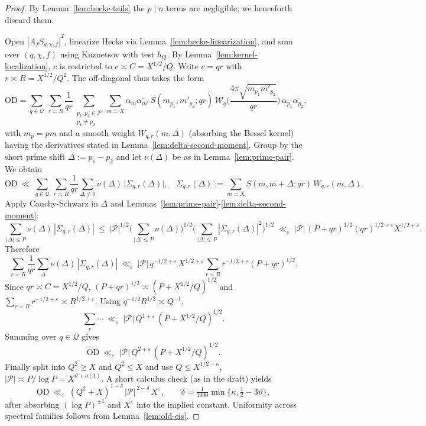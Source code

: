 \documentclass[11pt]{article}
\theoremstyle{definition}
\theoremstyle{remark}
\begin{document}
\begin{proof}
	By Lemma~\ref{lem:hecke-tails} the $p\mid n$ terms are negligible; we henceforth discard them.

	Open $|A_f S_{q,\chi,f}|^2$, linearize Hecke via Lemma~\ref{lem:hecke-linearization}, and sum over $(q,\chi,f)$ using Kuznetsov with test $h_Q$. By Lemma~\ref{lem:kernel-localization}, $c$ is restricted to $c\asymp C=X^{1/2}/Q$. Write $c=qr$ with $r\asymp R=X^{1/2}/Q^2$. The off-diagonal thus takes the form
	\[
		\mathrm{OD}
		=\sum_{q\in\mathcal Q}\ \sum_{r\asymp R}\frac{1}{qr}
		\sum_{\substack{p_1,p_2\in\mathcal P\\ p_1\ne p_2}}
		\sum_{m\asymp X}\!\alpha_m\overline{\alpha_{m'}}\,
		S(m_{p_1},m'_{p_2};qr)\,
		\mathcal W_q\!\Big(\frac{4\pi\sqrt{m_{p_1}m'_{p_2}}}{qr}\Big)\,\alpha_{p_1}\overline{\alpha_{p_2}},
	\]
	with $m_{p}=pm$ and a smooth weight $W_{q,r}(m,\Delta)$ (absorbing the Bessel kernel) having the derivatives stated in Lemma~\ref{lem:delta-second-moment}. Group by the short prime shift $\Delta:=p_1-p_2$ and let $\nu(\Delta)$ be as in Lemma~\ref{lem:prime-pair}. We obtain
	\[
		\mathrm{OD}
		\ \ll\ \sum_{q\in\mathcal Q}\ \sum_{r\asymp R}\frac{1}{qr}\sum_{\Delta\ne 0}\nu(\Delta)\,\big|\Sigma_{q,r}(\Delta)\big|,
		\quad
		\Sigma_{q,r}(\Delta):=\sum_{m\asymp X} S(m,m+\Delta;qr)\,W_{q,r}(m,\Delta).
	\]
	Apply Cauchy-Schwarz in $\Delta$ and Lemmas~\ref{lem:prime-pair}-\ref{lem:delta-second-moment}:
	\[
		\sum_{|\Delta|\le P}\nu(\Delta)\,|\Sigma_{q,r}(\Delta)|
		\ \le\ |\mathcal P|^{1/2}\Big(\sum_{|\Delta|\le P}\nu(\Delta)\Big)^{1/2}
		\Big(\sum_{|\Delta|\le P}|\Sigma_{q,r}(\Delta)|^2\Big)^{1/2}
		\ \ll_\varepsilon\ |\mathcal P|\,(P+qr)^{1/2}(qr)^{1/2+\varepsilon}X^{1/2+\varepsilon}.
	\]
	Therefore
	\[
		\sum_{r\asymp R}\frac{1}{qr}\sum_{\Delta}\nu(\Delta)\,|\Sigma_{q,r}(\Delta)|
		\ \ll_\varepsilon\ |\mathcal P|\,q^{-1/2+\varepsilon}\,X^{1/2+\varepsilon}\!
		\sum_{r\asymp R} r^{-1/2+\varepsilon}(P+qr)^{1/2}.
	\]
	Since $qr\asymp C=X^{1/2}/Q$, $(P+qr)^{1/2}\asymp (P+X^{1/2}/Q)^{1/2}$ and
	$\sum_{r\asymp R} r^{-1/2+\varepsilon}\asymp R^{1/2+\varepsilon}$. Using $q^{-1/2}R^{1/2}\asymp Q^{-1}$,
	\[
		\sum_{r}\cdots \ \ll_\varepsilon\ |\mathcal P|\,Q^{1+\varepsilon}\,(P+X^{1/2}/Q)^{1/2}.
	\]
	Summing over $q\in\mathcal Q$ gives
	\[
		\mathrm{OD}\ \ll_\varepsilon\ |\mathcal P|\,Q^{2+\varepsilon}\,(P+X^{1/2}/Q)^{1/2}.
	\]
	Finally split into $Q^2\ge X$ and $Q^2\le X$ and use $Q\le X^{1/2-\kappa}$, $|\mathcal P|\asymp P/\log P=X^{\vartheta+o(1)}$. A short calculus check (as in the draft) yields
	\[
		\mathrm{OD}\ \ll_\varepsilon\ (Q^2+X)^{1-\delta}\,|\mathcal P|^{\,2-\delta}\,X^{\varepsilon},
		\qquad
		\delta=\tfrac1{1000}\min\{\kappa,\tfrac12-3\vartheta\},
	\]
	after absorbing $(\log P)^{\pm1}$ and $X^\varepsilon$ into the implied constant. Uniformity across spectral families follows from Lemma~\ref{lem:old-eis}.
\end{proof}
\end{document}
